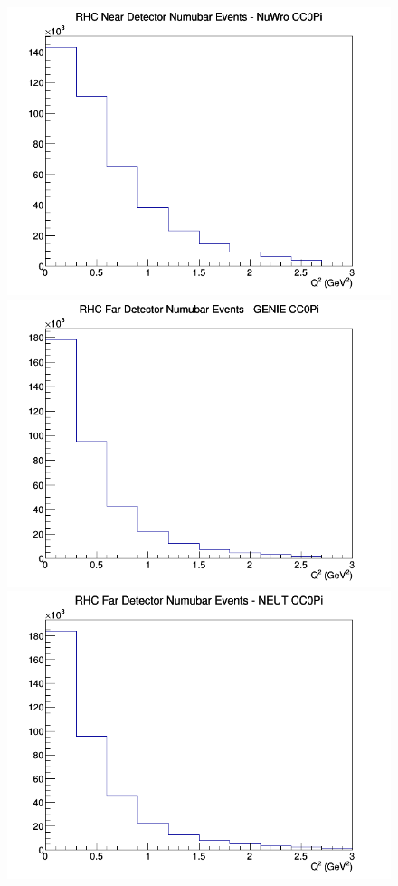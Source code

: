 \begin{figure}[h]
\includegraphics[width=\linewidth]{Q2/nominal/CC0Pi_RHC_ND_numubar_Q2_NuWro.png}
\endminipage
\newline
{}
\includegraphics[width=\linewidth]{Q2/nominal/CC0Pi_RHC_FD_numubar_Q2_GENIE.png}
\endminipage
{}
\includegraphics[width=\linewidth]{Q2/nominal/CC0Pi_RHC_FD_numubar_Q2_NEUT.png}

\end{figure}
